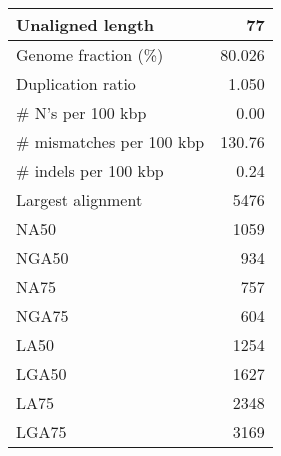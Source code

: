 \documentclass[12pt,a4paper]{article}
\begin{document}
\begin{table}[ht]
\begin{center}
\begin{tabular}{|l*{1}{|r}|}
Unaligned length & 77 \\ \hline
Genome fraction (\%) & 80.026 \\ \hline
Duplication ratio & 1.050 \\ \hline
\# N's per 100 kbp & 0.00 \\ \hline
\# mismatches per 100 kbp & 130.76 \\ \hline
\# indels per 100 kbp & 0.24 \\ \hline
Largest alignment & 5476 \\ \hline
NA50 & 1059 \\ \hline
NGA50 & 934 \\ \hline
NA75 & 757 \\ \hline
NGA75 & 604 \\ \hline
LA50 & 1254 \\ \hline
LGA50 & 1627 \\ \hline
LA75 & 2348 \\ \hline
LGA75 & 3169 \\ \hline
\end{tabular}
\end{center}
\end{table}
\end{document}

